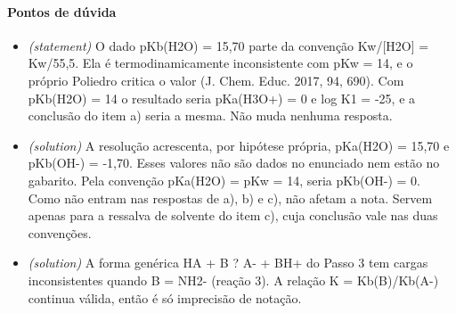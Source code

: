 \documentclass{article}%
\begin{document}
\paragraph{Pontos de dúvida}%
\begin{itemize}%
\item%
\textit{(statement)} O dado pKb(H2O) = 15,70 parte da convenção Kw/{[}H2O{]} = Kw/55,5. Ela é termodinamicamente inconsistente com pKw = 14, e o próprio Poliedro critica o valor (J. Chem. Educ. 2017, 94, 690). Com pKb(H2O) = 14 o resultado seria pKa(H3O+) = 0 e log K1 = -25, e a conclusão do item a) seria a mesma. Não muda nenhuma resposta.%
\item%
\textit{(solution)} A resolução acrescenta, por hipótese própria, pKa(H2O) = 15,70 e pKb(OH-) = -1,70. Esses valores não são dados no enunciado nem estão no gabarito. Pela convenção pKa(H2O) = pKw = 14, seria pKb(OH-) = 0. Como não entram nas respostas de a), b) e c), não afetam a nota. Servem apenas para a ressalva de solvente do item c), cuja conclusão vale nas duas convenções.%
\item%
\textit{(solution)} A forma genérica HA + B ? A- + BH+ do Passo 3 tem cargas inconsistentes quando B = NH2- (reação 3). A relação K = Kb(B)/Kb(A-) continua válida, então é só imprecisão de notação.%
\end{itemize}%
\end{document}
